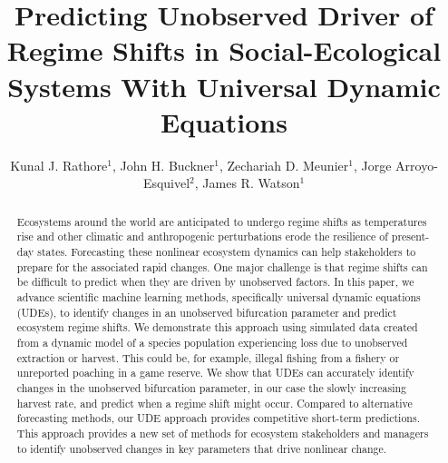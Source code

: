 \documentclass[openacc]{rsproca_new}%
\begin{document}
\title{Predicting Unobserved Driver of Regime Shifts in Social-Ecological Systems With Universal Dynamic Equations}

\author{%
Kunal J. Rathore$^{1}$, John H. Buckner$^{1}$, Zechariah D. Meunier$^{1}$, Jorge Arroyo-Esquivel$^{2}$, James R. Watson$^{1}$}

\address{$^{1}$College of Earth, Ocean, and Atmospheric Sciences, Oregon State University, Corvallis, Oregon, USA\\
$^{2}$California Department of Fish and Wildlife, West Sacramento, California, USA}

\subject{Ecology, Complex systems, social-ecological systems, Machine Learning, Regime Shifts, Non-linear dynamics}



\begin{abstract}
   Ecosystems around the world are anticipated to undergo regime shifts as temperatures rise and other climatic and anthropogenic perturbations erode the resilience of present-day states. Forecasting these nonlinear ecosystem dynamics can help stakeholders to prepare for the associated rapid changes. One major challenge is that regime shifts can be difficult to predict when they are driven by unobserved factors. In this paper, we advance scientific machine learning methods, specifically universal dynamic equations (UDEs), to identify changes in an unobserved bifurcation parameter and predict ecosystem regime shifts. We demonstrate this approach using simulated data created from a dynamic model of a species population experiencing loss due to unobserved extraction or harvest. This could be, for example, illegal fishing from a fishery or unreported poaching in a game reserve. We show that UDEs can accurately identify changes in the unobserved bifurcation parameter, in our case the slowly increasing harvest rate, and predict when a regime shift might occur. Compared to alternative forecasting methods, our UDE approach provides competitive short-term predictions. This approach provides a new set of methods for ecosystem stakeholders and managers to identify unobserved changes in key parameters that drive nonlinear change.
\end{abstract}
\end{document}
